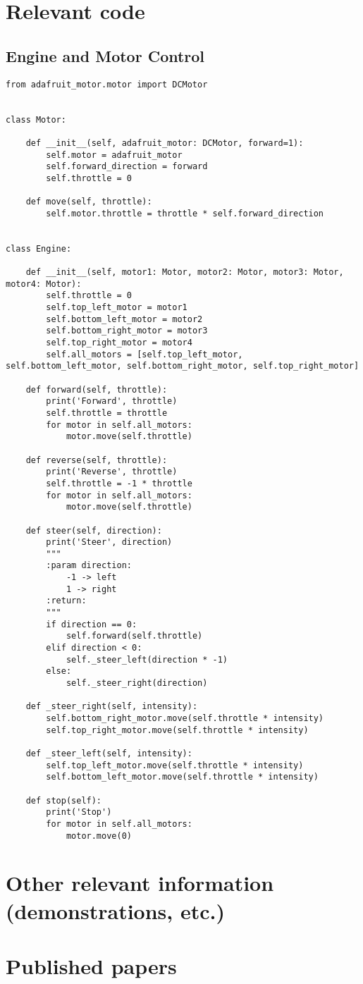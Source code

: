 \appendix
\chapter{Relevant code}
\label{ch:relevant-code}

\section{Engine and Motor Control}
\label{sec:annex-engine-motor-control}
\begin{verbatim}
from adafruit_motor.motor import DCMotor


class Motor:

    def __init__(self, adafruit_motor: DCMotor, forward=1):
        self.motor = adafruit_motor
        self.forward_direction = forward
        self.throttle = 0

    def move(self, throttle):
        self.motor.throttle = throttle * self.forward_direction


class Engine:

    def __init__(self, motor1: Motor, motor2: Motor, motor3: Motor, motor4: Motor):
        self.throttle = 0
        self.top_left_motor = motor1
        self.bottom_left_motor = motor2
        self.bottom_right_motor = motor3
        self.top_right_motor = motor4
        self.all_motors = [self.top_left_motor, self.bottom_left_motor, self.bottom_right_motor, self.top_right_motor]

    def forward(self, throttle):
        print('Forward', throttle)
        self.throttle = throttle
        for motor in self.all_motors:
            motor.move(self.throttle)

    def reverse(self, throttle):
        print('Reverse', throttle)
        self.throttle = -1 * throttle
        for motor in self.all_motors:
            motor.move(self.throttle)

    def steer(self, direction):
        print('Steer', direction)
        """
        :param direction:
            -1 -> left
            1 -> right
        :return:
        """
        if direction == 0:
            self.forward(self.throttle)
        elif direction < 0:
            self._steer_left(direction * -1)
        else:
            self._steer_right(direction)

    def _steer_right(self, intensity):
        self.bottom_right_motor.move(self.throttle * intensity)
        self.top_right_motor.move(self.throttle * intensity)

    def _steer_left(self, intensity):
        self.top_left_motor.move(self.throttle * intensity)
        self.bottom_left_motor.move(self.throttle * intensity)

    def stop(self):
        print('Stop')
        for motor in self.all_motors:
            motor.move(0)

\end{verbatim}

\chapter{Other relevant information (demonstrations, etc.)}
\label{ch:other-relevant}


\chapter{Published papers}
\label{ch:published-papers}